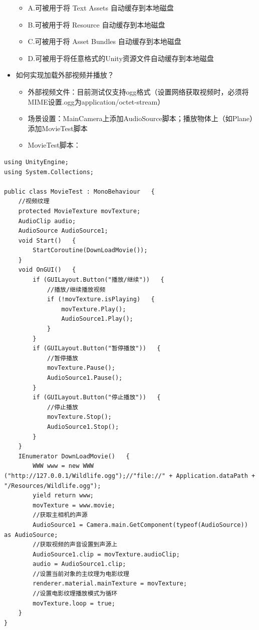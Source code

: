 \documentclass[9pt, b5paper]{article}
\begin{document}
\begin{itemize}
\begin{itemize}
\item A.可被用于将 Text Assets 自动缓存到本地磁盘
\item B.可被用于将 Resource 自动缓存到本地磁盘
\item C.可被用于将 Asset Bundles 自动缓存到本地磁盘
\item D.可被用于将任意格式的Unity资源文件自动缓存到本地磁盘
\end{itemize}
\item 如何实现加载外部视频并播放？
\begin{itemize}
\item 外部视频文件：目前测试仅支持ogg格式（设置网络获取视频时，必须将MIME设置.ogg为application/octet-stream）
\item 场景设置：MainCamera上添加AudioSource脚本；播放物体上（如Plane）添加MovieTest脚本
\item MovieTest脚本：
\end{itemize}
\end{itemize}
\begin{verbatim}
using UnityEngine;  
using System.Collections;  

public class MovieTest : MonoBehaviour   {  
    //视频纹理   
    protected MovieTexture movTexture;
    AudioClip audio;
    AudioSource AudioSource1;
    void Start()   {  
        StartCoroutine(DownLoadMovie());   
    }  
    void OnGUI()   {  
        if (GUILayout.Button("播放/继续"))   {  
            //播放/继续播放视频   
            if (!movTexture.isPlaying)   {  
                movTexture.Play();  
                AudioSource1.Play();
            }  
        }  
        if (GUILayout.Button("暂停播放"))   {  
            //暂停播放   
            movTexture.Pause();  
            AudioSource1.Pause(); 
        }  
        if (GUILayout.Button("停止播放"))   {  
            //停止播放   
            movTexture.Stop();  
            AudioSource1.Stop();
        }  
    }  
    IEnumerator DownLoadMovie()   {  
        WWW www = new WWW ("http://127.0.0.1/Wildlife.ogg");//"file://" + Application.dataPath + "/Resources/Wildlife.ogg");  
        yield return www;   
        movTexture = www.movie; 
        //获取主相机的声源
        AudioSource1 = Camera.main.GetComponent(typeof(AudioSource)) as AudioSource;
        //获取视频的声音设置到声源上
        AudioSource1.clip = movTexture.audioClip;
        audio = AudioSource1.clip;
        //设置当前对象的主纹理为电影纹理   
        renderer.material.mainTexture = movTexture;  
        //设置电影纹理播放模式为循环 
        movTexture.loop = true;
    }  
} 
\end{verbatim}
\end{document}
